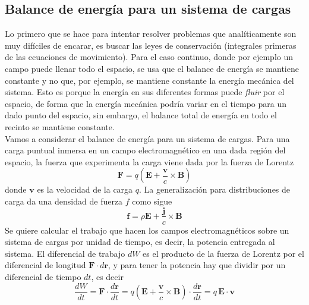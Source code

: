 
\subsection{Balance de energía para un sistema de cargas}
Lo primero que se hace para intentar resolver problemas que analíticamente son muy difíciles de encarar, es buscar las leyes de conservación (integrales primeras de las ecuaciones de movimiento). Para el caso continuo, donde por ejemplo un campo puede llenar todo el espacio, se usa que el balance de energía se mantiene constante y no que, por ejemplo, se mantiene constante la energía mecánica del sistema. Esto es porque la energía en sus diferentes formas puede \textit{fluir} por el espacio, de forma que la energía mecánica podría variar en el tiempo para un dado punto del espacio, sin embargo, el balance total de energía en todo el recinto se mantiene constante.\\
\indent Vamos a considerar el balance de energía para un sistema de cargas. Para una carga puntual inmersa en un campo electromagnético en una dada región del espacio, la fuerza que experimenta la carga viene dada por la fuerza de Lorentz
\begin{equation*}
    \textbf{F} = q
    \left(
        \textbf{E} + \frac{\textbf{v}}{c}\times \textbf{B}
    \right)
\end{equation*}
donde $\textbf{v}$ es la velocidad de la carga $q$. La generalización para distribuciones de carga da una densidad de fuerza $f$ como sigue
\begin{equation*}
    \textbf{f} = 
    \rho\textbf{E} + \frac{\textbf{j}}{c}\times \textbf{B}
\end{equation*}
Se quiere calcular el trabajo que hacen los campos electromagnéticos sobre un sistema de cargas por unidad de tiempo, es decir, la potencia entregada al sistema. El diferencial de trabajo $dW$ es el producto de la fuerza de Lorentz por el diferencial de longitud $\textbf{F}\cdot d\textbf{r}$, y para tener la potencia hay que dividir por un diferencial de tiempo $dt$, es decir
\begin{equation*}
    \frac{dW}{dt} 
    = \textbf{F}\cdot \frac{d\textbf{r}}{dt}
    = 
    q\left(
        \textbf{E} + \frac{\textbf{v}}{c}\times \textbf{B}
    \right)
    \cdot \frac{d\textbf{r}}{dt}
    = q\,\textbf{E}\cdot \textbf{v}
\end{equation*}
